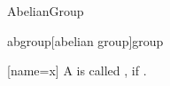 \documentclass{stex}
\begin{document}
\begin{smodule}{AbelianGroup}

  \begin{extstructure}{abgroup}[abelian group]{group}
    \begin{sdefinition}[for={abgroup}]
      [name=x]{}
      A  is called
      , if
      .
    \end{sdefinition}
  \end{extstructure}
\end{smodule}
\end{document}
